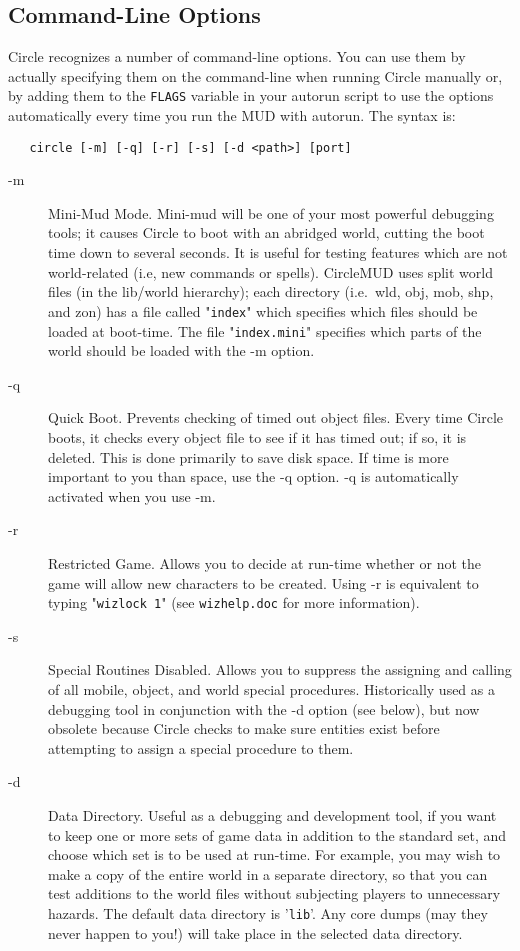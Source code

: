 \documentclass[11pt]{article}
\begin{document}
\subsection{Command-Line Options}
Circle recognizes a number of command-line options.  You can use them by actually specifying them on the command-line when running Circle manually or, by adding them to the \texttt{FLAGS} variable in your autorun script to use the options automatically every time you run the MUD with autorun.\newline
\newline
The syntax is:
\begin{verbatim}
   circle [-m] [-q] [-r] [-s] [-d <path>] [port]
\end{verbatim}
\begin{description}
\item[-m] Mini-Mud Mode.  Mini-mud will be one of your most powerful debugging tools; it causes Circle to boot with an abridged world, cutting the boot time down to several seconds.  It is useful for testing features which are not world-related (i.e, new commands or spells).\newline
CircleMUD uses split world files (in the lib/world hierarchy); each directory (i.e.\ wld, obj, mob, shp, and zon) has a file called "\texttt{index}" which specifies which files should be loaded at boot-time.  The file "\texttt{index.mini}" specifies which parts of the world should be loaded with the -m option.
\item[-q] Quick Boot.  Prevents checking of timed out object files.  Every time Circle boots, it checks every object file to see if it has timed out; if so, it is deleted.  This is done primarily to save disk space.  If time is more important to you than space, use the -q option.  -q is automatically activated when you use -m.
\item[-r] Restricted Game.  Allows you to decide at run-time whether or not the game will allow new characters to be created.  Using -r is equivalent to typing "\texttt{wizlock 1}" (see \texttt{wizhelp.doc} for more information).
\item[-s] Special Routines Disabled.  Allows you to suppress the assigning and calling of all mobile, object, and world special procedures. Historically used as a debugging tool in conjunction with the -d option (see below), but now obsolete because Circle checks to make sure entities exist before attempting to assign a special procedure to them.
\item[-d] Data Directory.  Useful as a debugging and development tool, if you want to keep one or more sets of game data in addition to the standard set, and choose which set is to be used at run-time.  For example, you may wish to make a copy of the entire world in a separate directory, so that you can test additions to the world files without subjecting players to unnecessary hazards.  The default data directory is '\texttt{lib}'.  Any core dumps (may they never happen to you!) will take place in the selected data directory.

\end{description}
\end{document}
